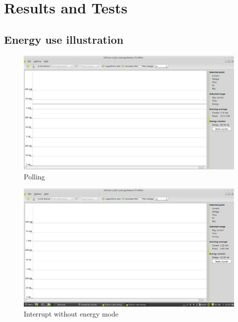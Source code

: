 \section{Results and Tests}

\subsection{Energy use illustration}


	\begin{center}	

	\begin{figure}
		\includegraphics[width=\textwidth]{fig/polling.png}
		\caption{Polling}
	\end{figure}

	\end{center}

	
	\begin{center}
		\begin{figure}
		
		\includegraphics[width=\textwidth]{fig/InterruptOnly.png}
		\caption{Interrupt without energy mode}
	\end{figure}
	\end{center}

